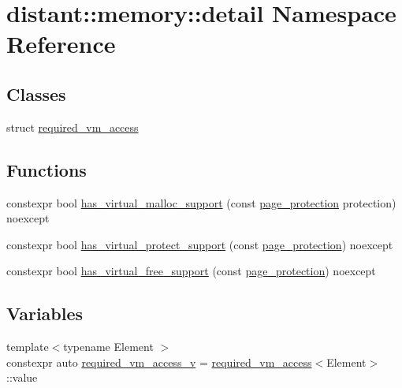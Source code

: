 \hypertarget{namespacedistant_1_1memory_1_1detail}{}\section{distant\+:\+:memory\+:\+:detail Namespace Reference}
\label{namespacedistant_1_1memory_1_1detail}
\subsection*{Classes}
\begin{DoxyCompactItemize}
\item 
struct \mbox{\hyperlink{structdistant_1_1memory_1_1detail_1_1required__vm__access}{required\+\_\+vm\+\_\+access}}
\end{DoxyCompactItemize}
\subsection*{Functions}
\begin{DoxyCompactItemize}
\item 
constexpr bool \mbox{\hyperlink{namespacedistant_1_1memory_1_1detail_aedea4bd490e2d4569980ab5ca06fa002}{has\+\_\+virtual\+\_\+malloc\+\_\+support}} (const \mbox{\hyperlink{structdistant_1_1access__rights_a09c6caea8f570f8e2d18c3ef2e2a7804}{page\+\_\+protection}} protection) noexcept
\item 
constexpr bool \mbox{\hyperlink{namespacedistant_1_1memory_1_1detail_a76e12690ca9aa8cbb31d90da4da578c8}{has\+\_\+virtual\+\_\+protect\+\_\+support}} (const \mbox{\hyperlink{structdistant_1_1access__rights_a09c6caea8f570f8e2d18c3ef2e2a7804}{page\+\_\+protection}}) noexcept
\item 
constexpr bool \mbox{\hyperlink{namespacedistant_1_1memory_1_1detail_ab1b2a08a1b2d006cc554980cdf35122f}{has\+\_\+virtual\+\_\+free\+\_\+support}} (const \mbox{\hyperlink{structdistant_1_1access__rights_a09c6caea8f570f8e2d18c3ef2e2a7804}{page\+\_\+protection}}) noexcept
\end{DoxyCompactItemize}
\subsection*{Variables}
\begin{DoxyCompactItemize}
\item 
{\footnotesize template$<$typename Element $>$ }\\constexpr auto \mbox{\hyperlink{namespacedistant_1_1memory_1_1detail_a7461fe5d026b57cad0e1d2c393d675ce}{required\+\_\+vm\+\_\+access\+\_\+v}} = \mbox{\hyperlink{structdistant_1_1memory_1_1detail_1_1required__vm__access}{required\+\_\+vm\+\_\+access}}$<$Element$>$\+::value
\end{DoxyCompactItemize}


